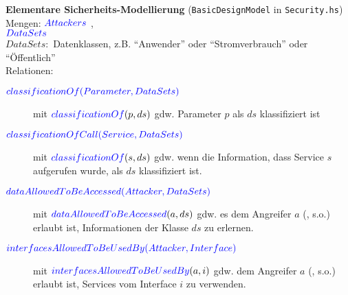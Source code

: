 \documentclass[varwidth=15cm]{standalone}
\begin{document}
\textbf{Elementare Sicherheits-Modellierung} (\texttt{BasicDesignModel} in \texttt{Security.hs})\\

Mengen: ${\color{blue}{Attackers}}$ , \\
        ${\color{blue}{DataSets}}$ \\

$DataSets:$ Datenklassen, z.B. \enquote{Anwender} oder \enquote{Stromverbrauch} oder \enquote{Öffentlich} \\


Relationen:
\begin{description}
  \item[${\color{blue}{classificationOf(Parameter, DataSets)}}$]
        mit ${\color{blue}{classificationOf}}(p, ds)$ gdw. Parameter $p$ als $ds$ klassifiziert ist
  \item[${\color{blue}{classificationOfCall(Service, DataSets)}}$]
        mit ${\color{blue}{classificationOf}}(s, ds)$ gdw. wenn die Information, dass
        Service $s$ aufgerufen wurde, als $ds$ klassifiziert ist.
  \item[${\color{blue}{dataAllowedToBeAccessed(Attacker, DataSets)}}$]
        mit ${\color{blue}{dataAllowedToBeAccessed}}(a, ds)$ gdw. es dem Angreifer $a$ (, s.o.)
        erlaubt ist, Informationen der  Klasse $ds$ zu erlernen. \\

  \item[${\color{blue}{interfacesAllowedToBeUsedBy(Attacker, Interface)}}$]
        mit ${\color{blue}{interfacesAllowedToBeUsedBy}}(a, i)$ gdw. dem Angreifer $a$ (, s.o.) erlaubt ist, Services vom Interface $i$ zu verwenden.\\[0.5cm]


\end{description}
\end{document}

